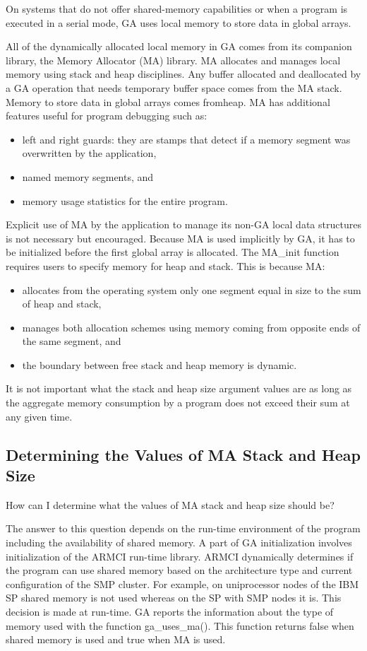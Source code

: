 On systems that do not offer shared-memory capabilities or when a
program is executed in a serial mode, GA uses local memory to store
data in global arrays.

All of the dynamically allocated local memory in GA comes from its
companion library, the Memory Allocator (MA) library. MA allocates
and manages local memory using stack and heap disciplines. Any buffer
allocated and deallocated by a GA operation that needs temporary buffer
space comes from the MA stack. Memory to store data in global arrays
comes fromheap. MA has additional features useful for program debugging
such as:
\begin{itemize}
\item left and right guards: they are stamps that detect if a memory segment
was overwritten by the application, 
\item named memory segments, and 
\item memory usage statistics for the entire program.
\end{itemize}
Explicit use of MA by the application to manage its non-GA local data
structures is not necessary but encouraged. Because MA is used implicitly
by GA, it has to be initialized before the first global array is allocated.
The MA\_init function requires users to specify memory for heap and
stack. This is because MA:
\begin{itemize}
\item allocates from the operating system only one segment equal in size
to the sum of heap and stack, 
\item manages both allocation schemes using memory coming from opposite
ends of the same segment, and 
\item the boundary between free stack and heap memory is dynamic.
\end{itemize}
It is not important what the stack and heap size argument values are
as long as the aggregate memory consumption by a program does not
exceed their sum at any given time. 


\subsection{Determining the Values of MA Stack and Heap Size}

How can I determine what the values of MA stack and heap size should
be? 

The answer to this question depends on the run-time environment of
the program including the availability of shared memory. A part of
GA initialization involves initialization of the ARMCI run-time library.
ARMCI dynamically determines if the program can use shared memory
based on the architecture type and current configuration of the SMP
cluster. For example, on uniprocessor nodes of the IBM SP shared memory
is not used whereas on the SP with SMP nodes it is. This decision
is made at run-time. GA reports the information about the type of
memory used with the function ga\_uses\_ma(). This function returns
false when shared memory is used and true when MA is used.

